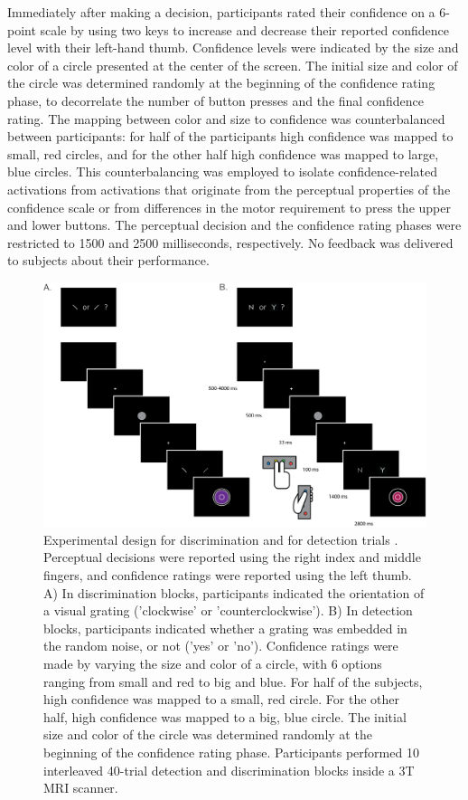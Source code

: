 \documentclass[12pt,twoside]{reedthesis}
\begin{document}
Immediately after making a decision, participants rated their confidence on a 6-point scale by using two keys to increase and decrease their reported confidence level with their left-hand thumb. Confidence levels were indicated by the size and color of a circle presented at the center of the screen. The initial size and color of the circle was determined randomly at the beginning of the confidence rating phase, to decorrelate the number of button presses and the final confidence rating. The mapping between color and size to confidence was counterbalanced between participants: for half of the participants high confidence was mapped to small, red circles, and for the other half high confidence was mapped to large, blue circles. This counterbalancing was employed to isolate confidence-related activations from activations that originate from the perceptual properties of the confidence scale or from differences in the motor requirement to press the upper and lower buttons. The perceptual decision and the confidence rating phases were restricted to 1500 and 2500 milliseconds, respectively. No feedback was delivered to subjects about their performance.
\begin{figure}
\includegraphics[width=\linewidth]{figure/ch3/design} \caption[Experimental design, imaging experiment]{Experimental design for discrimination and for detection trials . Perceptual decisions were reported using the right index and middle fingers, and confidence ratings were reported using the left thumb. A) In discrimination blocks, participants indicated the orientation of a visual grating ('clockwise' or 'counterclockwise'). B) In detection blocks, participants indicated whether a grating was embedded in the random noise, or not ('yes' or 'no'). Confidence ratings were made by varying the size and color of a circle, with 6 options ranging from small and red to big and blue. For half of the subjects, high confidence was mapped to a small, red circle. For the other half, high confidence was mapped to a big, blue circle. The initial size and color of the circle was determined randomly at the beginning of the confidence rating phase. Participants performed 10 interleaved 40-trial detection and discrimination blocks inside a 3T MRI scanner.}\label{fig:ch3-exp1-design}
\end{figure}
\end{document}
